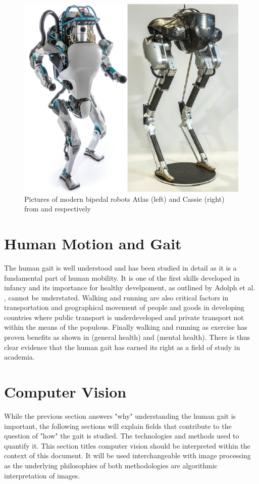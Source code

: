 \begin{figure}[!ht] 
\captionsetup{width=0.8\linewidth, font=small}  
\includegraphics[width=0.8\linewidth]{figures/bipeds.png}
\caption{Pictures of modern bipedal robots Atlas (left) and Cassie (right) from \cite{bdpic} and \cite{arpic} respectively}
\label{fig:bipeds}
\end{figure}

\section{Human Motion and Gait}
The human gait is well understood and has been studied in detail as it is a fundamental part of human mobility. It is one of the first skills developed in infancy and its importance for healthy develpoment, as outlined by Adolph et al. \cite{adolph2013road}, cannot be understated. Walking and running are also critical factors in transportation and geographical movement of people and goods in developing countries where public transport is underdeveloped and private transport not within the means of the populous. Finally walking and running as exercise has proven benefits as shown in \cite{hanson2015there} (general health) and \cite{fox1999influence} (mental health). There is thus clear evidence that the human gait has earned its right as a field of study in academia.

\section{Computer Vision}
While the previous section answers "why" understanding the human gait is important, the following sections will explain fields that contribute to the question of "how" the gait is studied. The technologies and methods used to quantify it. This section titles computer vision should be interpreted within the context of this document. It will be used interchangeable with image processing as the underlying philosophies of both methodologies are algorithmic interpretation of images.

